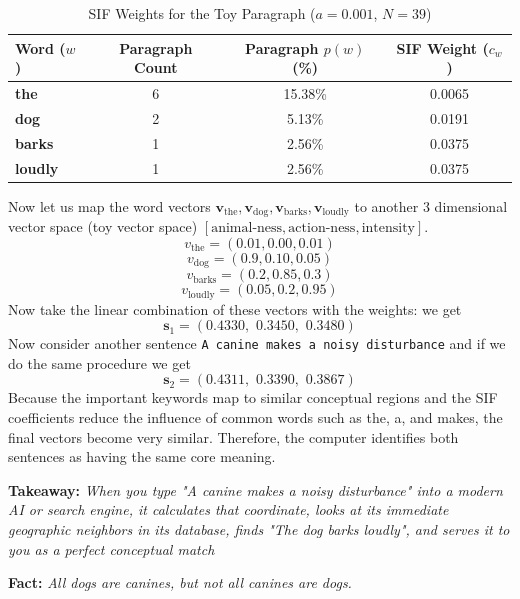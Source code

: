 \documentclass[DIV=20,oneside]{scrartcl}
\newcommand{\takeaway}[1]{%
	\begin{tcolorbox}[
		colback=black!20,
		colframe=black,
		boxrule=0.5pt,
		arc=2mm]
		\textbf{Takeaway: } #1
	\end{tcolorbox}
}
\begin{document}
\begin{table}[H]
	\centering
	\caption{SIF Weights for the Toy Paragraph ($a = 0.001$, $N = 39$)}
	\label{tab:sif_weights}
	\begin{tabular}{|l|c|c|c|}
		\hline
		\textbf{Word ($w$)} & \textbf{Paragraph Count} & \textbf{Paragraph $p(w)$ (\%)} & \textbf{SIF Weight ($c_w$)} \\ \hline
		\textbf{the}        & 6                        & 15.38\%                       & 0.0065                      \\ \hline
		\textbf{dog}        & 2                        & 5.13\%                        & 0.0191                      \\ \hline
		\textbf{barks}      & 1                        & 2.56\%                        & 0.0375                      \\ \hline
		\textbf{loudly}     & 1                        & 2.56\%                        & 0.0375                      \\ \hline
	\end{tabular}
\end{table}
Now let us map the word vectors $\mathbf{v}_{\text{the}}, \mathbf{v}_{\text{dog}}, \mathbf{v}_{\text{barks}}, \mathbf{v}_{\text{loudly}}$ to another 3 dimensional vector space (toy vector space) $[\text{animal-ness}, \text{action-ness}, \text{intensity}]$.
$$v_{\text{the}}=(0.01, 0.00, 0.01)$$
$$v_{\text{dog}}=(0.9, 0.10, 0.05)$$
$$v_{\text{barks}}=(0.2, 0.85, 0.3)$$
$$v_{\text{loudly}}=(0.05, 0.2, 0.95)$$
Now take the linear combination of these vectors with the weights: we get
$$\mathbf{s}_1 = (0.4330, \,\, 0.3450, \,\, 0.3480)$$
Now consider another sentence \texttt{A canine makes a noisy disturbance} and if we do the same procedure we get
$$\mathbf{s}_2 = (0.4311, \,\, 0.3390, \,\, 0.3867)$$
Because the important keywords map to similar conceptual regions and the SIF coefficients reduce the influence of common words such as the, a, and makes, the final vectors become very similar. Therefore, the computer identifies both sentences as having the same core meaning. 

\takeaway{\textit{When you type "A canine makes a noisy disturbance" into a modern AI or search engine, it calculates that coordinate, looks at its immediate geographic neighbors in its database, finds "The dog barks loudly", and serves it to you as a perfect conceptual match}}
\textbf{Fact: }\textit{All dogs are canines, but not all canines are dogs. }
\end{document}
